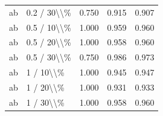 \begin{table}[!h]
\begin{tabular}[t]{llccc}
\addlinespace
ab & 0.2 / 30\textbackslash{}\textbackslash{}\% & 0.750 & 0.915 & 0.907\\
ab & 0.5 / 10\textbackslash{}\textbackslash{}\% & 1.000 & 0.959 & 0.960\\
ab & 0.5 / 20\textbackslash{}\textbackslash{}\% & 1.000 & 0.958 & 0.960\\
ab & 0.5 / 30\textbackslash{}\textbackslash{}\% & 0.750 & 0.986 & 0.973\\
ab & 1 / 10\textbackslash{}\textbackslash{}\% & 1.000 & 0.945 & 0.947\\
\addlinespace
ab & 1 / 20\textbackslash{}\textbackslash{}\% & 1.000 & 0.931 & 0.933\\
ab & 1 / 30\textbackslash{}\textbackslash{}\% & 1.000 & 0.958 & 0.960\\
\bottomrule
\end{tabular}
\end{table}
